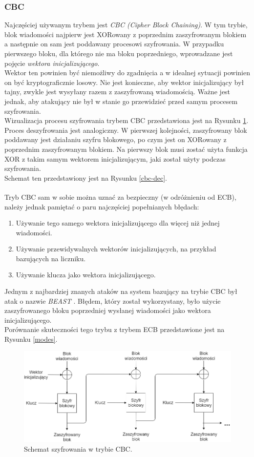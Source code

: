 \subsubsection{CBC}
Najczęściej używanym trybem jest \textit{CBC (Cipher Block Chaining)}. 
W tym trybie, blok wiadomości najpierw jest XORowany z poprzednim zaszyfrowanym blokiem a następnie
on sam jest poddawany procesowi szyfrowania. W przypadku pierwszego bloku, dla którego nie ma bloku poprzedniego, 
wprowadzane jest pojęcie \textit{wektora inicjalizującego}. \\ 
Wektor ten powinien być niemożliwy do zgadnięcia a w idealnej sytuacji powinien on być kryptograficznie losowy. Nie jest konieczne, aby wektor inicjalizujący był tajny, zwykle jest wysyłany razem z zaszyfrowaną wiadomością. Ważne jest jednak, aby atakujący nie był w stanie go przewidzieć przed samym procesem szyfrowania. \\ 
Wizualizacja procesu szyfrowania trybem CBC przedstawiona jest na Rysunku \ref{cbc-enc}. \\
Proces deszyfrowania jest analogiczny. W pierwszej kolejności, zaszyfrowany blok poddawany jest działaniu szyfru 
blokowego, po czym jest on XORowany z poprzednim zaszyfrowanym blokiem. Na pierwszy blok musi zostać użyta funkcja XOR
z takim samym wektorem inicjalizującym, jaki został użyty podczas szyfrowania. \\ 
Schemat ten przedstawiony jest na Rysunku \ref{cbc-dec}. \\\\
Tryb CBC sam w sobie można uznać za bezpieczny (w odróżnieniu od ECB), 
należy jednak pamiętać o paru najczęściej popełnianych błędach:
\begin{enumerate}
	\item Używanie tego samego wektora inicjalizującego dla więcej niż jednej wiadomości.
	\item Używanie przewidywalnych wektorów inicjalizujących, na przykład bazujących na liczniku.
	\item Używanie klucza jako wektora inicjalizującego. 
\end{enumerate}
Jednym z najbardziej znanych ataków na system bazujący na trybie CBC był atak o nazwie \textit{BEAST} \cite{beast}. 
Błędem, który został wykorzystany, było użycie zaszyfrowanego bloku poprzedniej wysłanej wiadomości jako wektora inicjalizującego. \\
Porównanie skuteczności tego trybu z trybem ECB przedstawione jest na Rysunku \ref{modes}.
\begin{figure}
    \centering
	\includegraphics[width=\textwidth]{content/images/cbc-enc-scheme}
    \caption{Schemat szyfrowania w trybie CBC.}
    \label{cbc-enc}
\end{figure}
